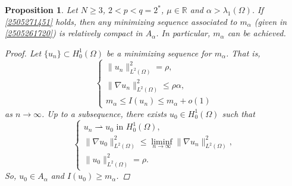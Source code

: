 \documentclass[10pt,a4paper]{amsart}
\newtheorem{proposition}{Proposition}
\begin{document}
\begin{proposition}\label{P050601}
Let $N\geq 3$, $2<p<q=2^*$, $\mu\in \mathbb{R}$ and $\alpha>\lambda_{1}(\Omega)$. If \eqref{2505271451} holds, then any minimizing sequence associated to $m_{\alpha}$ {\rm(}given in \eqref{2505261720}{\rm)} is relatively compact in $A_{\alpha}$. In particular, $m_{\alpha}$ can be achieved.
\begin{proof}
Let $\{u_n\}\subset H^1_0(\Omega)$ be a minimizing sequence for $m_{\alpha}$. That is,
\begin{equation}\label{040503}
\begin{cases}
\|u_n\|^{2}_{L^{2}(\Omega)}=\rho, \\
\|\nabla u_n\|^{2}_{L^{2}(\Omega)}\leq\rho\alpha, \\
m_{\alpha}\leq I(u_n)\leq m_{\alpha}+o(1)
\end{cases}
\end{equation}
as $n \rightarrow \infty$. Up to a subsequence, there exists $u_0\in H^1_0(\Omega)$ such that
\begin{equation*}
\begin{cases}
u_n\rightharpoonup u_0 \text{ in } H^1_0(\Omega), \\
\|\nabla u_0\|^{2}_{L^{2}(\Omega)}\leq\liminf\limits_{n\rightarrow \infty}\|\nabla u_n\|^{2}_{L^{2}(\Omega)}, \\
\|u_0\|^{2}_{L^{2}(\Omega)}=\rho.
\end{cases}
\end{equation*}
So, $u_0\in A_{\alpha}$ and $I(u_0)\geq m_{\alpha}$.


\end{proof}
\end{proposition}
\end{document}

